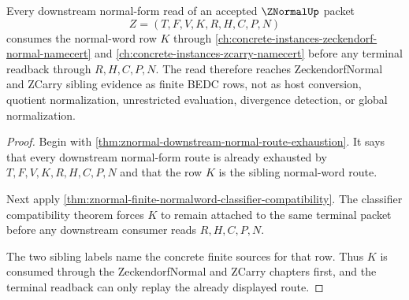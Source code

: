 \begin{theorem}
\label{thm:znormal-downstream-normal-route-zcarry-dependency}
Every downstream normal-form read of an accepted $\ZNormalUp$ packet
$$
Z=(T,F,V,K,R,H,C,P,N)
$$
consumes the normal-word row $K$ through \autoref{ch:concrete-instances-zeckendorf-normal-namecert} and \autoref{ch:concrete-instances-zcarry-namecert} before any terminal readback through $R,H,C,P,N$. The read therefore reaches ZeckendorfNormal and ZCarry sibling evidence as finite BEDC rows, not as host conversion, quotient normalization, unrestricted evaluation, divergence detection, or global normalization.
\end{theorem}
\begin{proof}
Begin with \autoref{thm:znormal-downstream-normal-route-exhaustion}. It says that every downstream normal-form route is already exhausted by $T,F,V,K,R,H,C,P,N$ and that the row $K$ is the sibling normal-word route.

Next apply \autoref{thm:znormal-finite-normalword-classifier-compatibility}. The classifier compatibility theorem forces $K$ to remain attached to the same terminal packet before any downstream consumer reads $R,H,C,P,N$.

The two sibling labels name the concrete finite sources for that row. Thus $K$ is consumed through the ZeckendorfNormal and ZCarry chapters first, and the terminal readback can only replay the already displayed route.
\end{proof}

